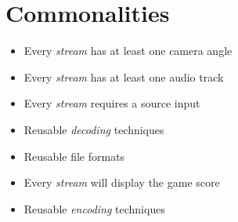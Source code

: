 \section{Commonalities}
\begin{itemize}
    \item Every \textit{stream} has at least one camera angle
    \item Every \textit{stream} has at least one audio track
    \item Every \textit{stream} requires a source input
    \item Reusable \textit{decoding} techniques
    \item Reusable file formats
    \item Every \textit{stream} will display the game score
    \item Reusable \textit{encoding} techniques
\end{itemize}